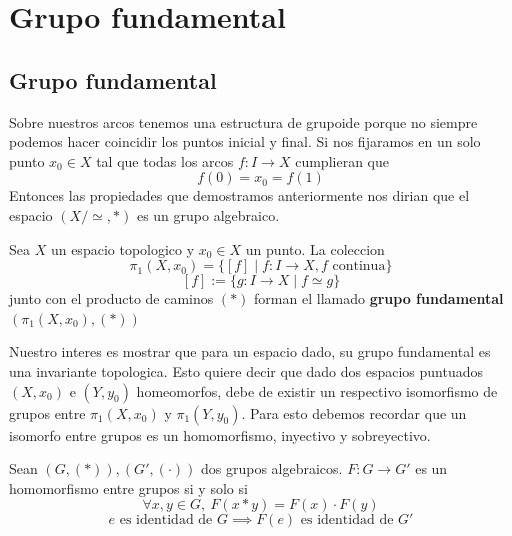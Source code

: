 \section{Grupo fundamental}

{
\newcommand{\homRelAlt}{\stackrel{.}{\simeq}}



\subsection{Grupo fundamental}
Sobre nuestros arcos tenemos una estructura de grupoide porque no siempre
podemos hacer coincidir los puntos inicial y final. Si nos fijaramos en
un solo punto \(x_0 \in X\) tal que todas los arcos \(f : I \to X\)
cumplieran que
\[ f(0) = x_0 = f (1) \]
Entonces las propiedades que demostramos anteriormente nos dirian que el
espacio \((X / \simeq, *)\) es un grupo algebraico.
\begin{definicion}
  Sea \(X\) un espacio topologico y \(x_0 \in X\) un punto. La coleccion
  \[ \pi_1 (X,x_0) = \{ [f] \mid f : I \to X, f \text{ continua}\}\]
  \[ [f] := \{ g : I \to X \mid f \simeq g\}\]
  junto con el producto de caminos \((*)\) forman el llamado
  \textbf{grupo fundamental} \((\pi_1(X,x_0), (*))\)
\end{definicion}

Nuestro interes es mostrar que para un espacio dado, su grupo
fundamental es una invariante topologica. Esto quiere decir que dado dos
espacios puntuados \((X,x_0)\) e \((Y,y_0)\) homeomorfos, debe de
existir un respectivo isomorfismo de grupos entre \(\pi_1(X,x_0)\) y
\(\pi_1(Y,y_0)\). Para esto debemos recordar que un isomorfo entre
grupos es un homomorfismo, inyectivo y sobreyectivo.
\begin{definicion}
  Sean \((G,(*)), (G', (\cdot))\) dos grupos algebraicos. \(F : G \to
  G'\) es un homomorfismo entre grupos si y solo si
  \[ \forall x,y \in G,\ F (x * y) = F(x) \cdot F(y)\]
  \[ e \text{ es identidad de } G \implies F(e) \text { es identidad de } G' \]
\end{definicion}

}
